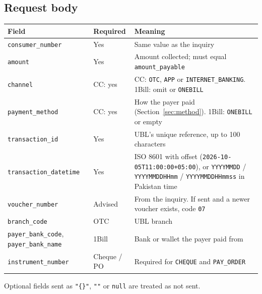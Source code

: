 \documentclass[11pt]{article}
\begin{document}
\subsection{Request body}
\begin{longtable}{@{}p{} >{\raggedright\arraybackslash}p{} >{\raggedright\arraybackslash}p{}@{}}
\toprule
\textbf{Field} & \textbf{Required} & \textbf{Meaning} \\
\midrule
\endhead
\texttt{consumer\_number} & Yes & Same value as the inquiry \\
\texttt{amount} & Yes & Amount collected; must equal \texttt{amount\_payable} \\
\texttt{channel} & CC: yes & CC: \texttt{OTC}, \texttt{APP} or \texttt{INTERNET\_BANKING}. 1Bill: omit or \texttt{ONEBILL} \\
\texttt{payment\_method} & CC: yes & How the payer paid (Section~\ref{sec:method}). 1Bill: \texttt{ONEBILL} or empty \\
\texttt{transaction\_id} & Yes & UBL's unique reference, up to 100 characters \\
\texttt{transaction\_datetime} & Yes & ISO 8601 with offset (\texttt{2026-10-05T11:00:00+05:00}), or \texttt{YYYYMMDD} / \texttt{YYYYMMDDHHmm} / \texttt{YYYYMMDDHHmmss} in Pakistan time \\
\texttt{voucher\_number} & Advised & From the inquiry. If sent and a newer voucher exists, code \texttt{07} \\
\texttt{branch\_code} & OTC & UBL branch \\
\texttt{payer\_bank\_code}, \texttt{payer\_bank\_name} & 1Bill & Bank or wallet the payer paid from \\
\texttt{instrument\_number} & Cheque / PO & Required for \texttt{CHEQUE} and \texttt{PAY\_ORDER} \\
\bottomrule
\end{longtable}
Optional fields sent as \texttt{"\{\}"}, \texttt{""} or \texttt{null} are treated as not sent.
\end{document}
